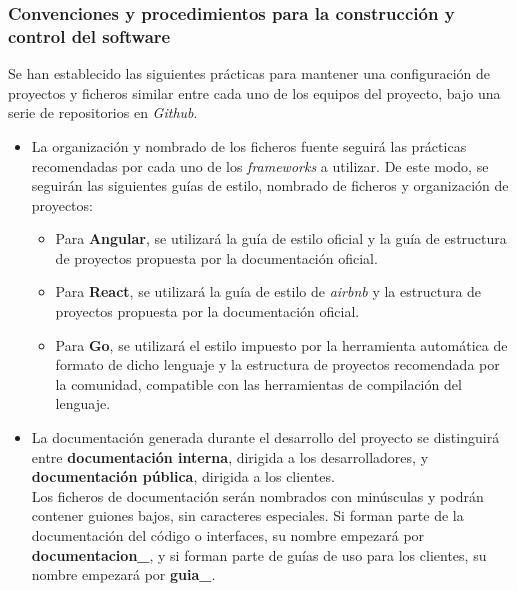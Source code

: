 \documentclass[11pt, a4paper, titlepage]{article}
\begin{document}

\subsubsection{Convenciones y procedimientos para la construcción y control del software}

Se han establecido las siguientes prácticas para mantener una configuración de proyectos y ficheros similar entre cada uno de los equipos del proyecto, bajo una serie de repositorios en \textit{Github}.

\begin{itemize}
    \item La organización y nombrado de los ficheros fuente seguirá las prácticas recomendadas por cada uno de los \textit{frameworks} a utilizar. De este modo, se seguirán las siguientes guías de estilo, nombrado de ficheros y organización de proyectos:
    \begin{itemize}
        \item Para \textbf{Angular}, se utilizará la guía de estilo oficial\cite{estiloangular} y la guía de estructura de proyectos propuesta por la documentación oficial\cite{estructuraangular}.

        \item Para \textbf{React}, se utilizará la
        guía de estilo de \textit{airbnb}\cite{estiloreact} y la estructura de proyectos propuesta por la documentación oficial\cite{estructurareact}.

        \item Para \textbf{Go}, se utilizará el estilo impuesto por la herramienta automática de formato de dicho lenguaje\cite{estilogolang} y la estructura de proyectos recomendada por la comunidad\cite{estructuragolang}, compatible con las herramientas de compilación del lenguaje.
    \end{itemize}

    \item La documentación generada durante el desarrollo del proyecto se distinguirá entre \textbf{documentación interna}, dirigida a los desarrolladores, y \textbf{documentación pública}, dirigida a los clientes.\\

    Los ficheros de documentación serán nombrados con minúsculas y podrán contener guiones bajos, sin caracteres especiales. Si forman parte de la documentación del código o interfaces, su nombre empezará por \textbf{documentacion\_}, y si forman parte de guías de uso para los clientes, su nombre empezará por \textbf{guia\_}.


\end{itemize}
\end{document}
